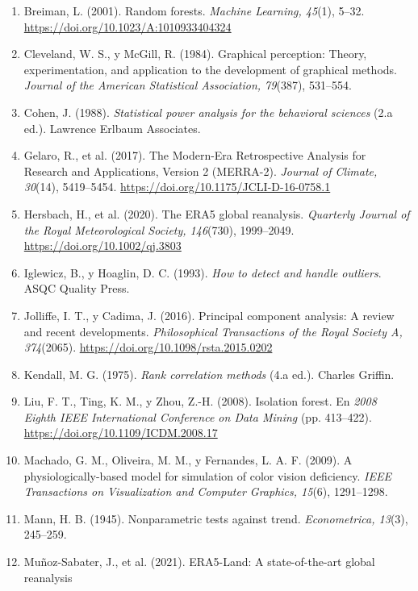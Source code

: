 \documentclass[11pt,a4paper]{article}
\begin{document}
\begin{enumerate}[label={},leftmargin=1.2em,itemindent=-1.2em,itemsep=0.65em]
  \item Breiman, L. (2001). Random forests. \emph{Machine Learning, 45}(1), 5--32.
        \url{https://doi.org/10.1023/A:1010933404324}
  \item Cleveland, W. S., y McGill, R. (1984). Graphical perception: Theory,
        experimentation, and application to the development of graphical methods.
        \emph{Journal of the American Statistical Association, 79}(387), 531--554.
  \item Cohen, J. (1988). \emph{Statistical power analysis for the behavioral sciences}
        (2.a ed.). Lawrence Erlbaum Associates.
  \item Gelaro, R., et al. (2017). The Modern-Era Retrospective Analysis for Research and
        Applications, Version 2 (MERRA-2). \emph{Journal of Climate, 30}(14), 5419--5454.
        \url{https://doi.org/10.1175/JCLI-D-16-0758.1}
  \item Hersbach, H., et al. (2020). The ERA5 global reanalysis. \emph{Quarterly Journal of
        the Royal Meteorological Society, 146}(730), 1999--2049.
        \url{https://doi.org/10.1002/qj.3803}
  \item Iglewicz, B., y Hoaglin, D. C. (1993). \emph{How to detect and handle outliers}.
        ASQC Quality Press.
  \item Jolliffe, I. T., y Cadima, J. (2016). Principal component analysis: A review and
        recent developments. \emph{Philosophical Transactions of the Royal Society A,
        374}(2065). \url{https://doi.org/10.1098/rsta.2015.0202}
  \item Kendall, M. G. (1975). \emph{Rank correlation methods} (4.a ed.). Charles Griffin.
  \item Liu, F. T., Ting, K. M., y Zhou, Z.-H. (2008). Isolation forest. En \emph{2008
        Eighth IEEE International Conference on Data Mining} (pp. 413--422).
        \url{https://doi.org/10.1109/ICDM.2008.17}
  \item Machado, G. M., Oliveira, M. M., y Fernandes, L. A. F. (2009). A
        physiologically-based model for simulation of color vision deficiency.
        \emph{IEEE Transactions on Visualization and Computer Graphics, 15}(6), 1291--1298.
  \item Mann, H. B. (1945). Nonparametric tests against trend. \emph{Econometrica, 13}(3),
        245--259.
  \item Muñoz-Sabater, J., et al. (2021). ERA5-Land: A state-of-the-art global reanalysis

\end{enumerate}
\end{document}
